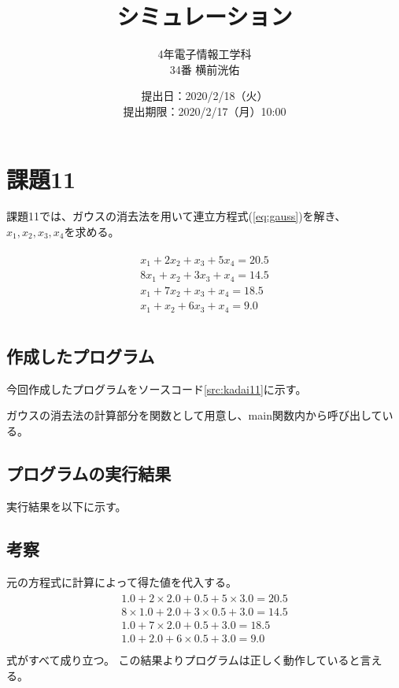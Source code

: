 \documentclass[11pt,titlepage]{jsarticle}
\title{シミュレーション}
\author{4年電子情報工学科\\34番 横前洸佑}
\date{提出日：2020/2/18（火）\\	提出期限：2020/2/17（月）10:00}
\begin{document}
\maketitle

\section{課題11}
課題11では、ガウスの消去法を用いて連立方程式(\ref{eq:gauss})を解き、$x_1, x_2, x_3, x_4$を求める。


\begin{eqnarray}
\label{eq:gauss}
		\begin{array}{l}
			x_1 + 2x_2 + x_3 + 5x_4 = 20.5\\
			8x_1 + x_2 + 3x_3 + x_4 = 14.5\\
			x_1 + 7x_2 + x_3 + x_4 = 18.5\\
			x_1 + x_2 + 6x_3 + x_4 = 9.0\\
		\end{array}
\end{eqnarray}

\subsection{作成したプログラム}
今回作成したプログラムをソースコード\ref{src:kadai11}に示す。


ガウスの消去法の計算部分を関数として用意し、main関数内から呼び出している。

\subsection{プログラムの実行結果}
実行結果を以下に示す。
\begin{oframed}
\end{oframed}

\subsection{考察}
元の方程式に計算によって得た値を代入する。
\begin{eqnarray}
\label{eq:gauss_result}
		\begin{array}{l}
			1.0 + 2\times2.0 + 0.5 + 5\times3.0 = 20.5\\
			8\times1.0 + 2.0 + 3\times0.5 + 3.0 = 14.5\\
			1.0 + 7\times2.0 + 0.5 + 3.0 = 18.5\\
			1.0 + 2.0 + 6\times0.5 + 3.0 = 9.0\\
		\end{array}
\end{eqnarray}
式がすべて成り立つ。
この結果よりプログラムは正しく動作していると言える。
\end{document}
